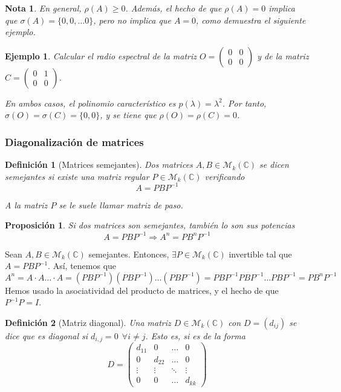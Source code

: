 \documentclass[11pt, a4paper]{article}
\makeatletter
\newif\IfInSansMode
\let\oldsf\sffamily
\renewcommand*{\sffamily}{\oldsf\mathversion{sans}\InSansModetrue}
\let\oldnorm\normalfont
\renewcommand*{\normalfont}{\oldnorm\InSansModefalse\mathversion{normal}}
\renewenvironment{proof}[1][\proofname] {\vspace{-15pt}\par\pushQED{\qed}\normalfont\topsep6\p@\@plus6\p@\relax\trivlist\item[\hskip\labelsep\it#1\@addpunct{.}]\ignorespaces}{\popQED\endtrivlist\@endpefalse}
\numberwithin{equation}{section}
\newcommand{\m}[4]{%
  \begin{pmatrix} #1 & #2 \\ #3 & #4\end{pmatrix}
}
\renewenvironment{proof}[1][\proofname] {\par\pushQED{\qed}\normalfont\topsep6\p@\@plus6\p@\relax\trivlist\item[\hskip\labelsep\itshape\sffamily#1\@addpunct{.}]\ignorespaces}{\popQED\endtrivlist\@endpefalse}
\theoremstyle{theorem-style}
\newtheorem{nprop}{Proposición}[section]
\theoremstyle{definition-style}
\newtheorem{ndef}{Definición}[section]
\theoremstyle{remark-style}
\newtheorem*{nota}{Nota}
\theoremstyle{example-style}
\newtheorem{ejemplo}{Ejemplo}[section]
\makeatother
\begin{document}
\begin{nota}
  En general, $\rho(A) \ge 0$. Además, el hecho de que $\rho(A) = 0$  implica que $\sigma(A) = \{0, 0, \hdots 0\}$, pero no implica que $A=0$, como demuestra el siguiente ejemplo.
  
\end{nota}

\begin{ejemplo} Calcular el radio espectral de la matriz $O = \m{0}{0}{0}{0}$ y de la matriz $C = \m{0}{1}{0}{0}$.

En ambos casos, el polinomio característico es $p(\lambda) = \lambda^2$. Por tanto, $\sigma(O) = \sigma(C) = \{0,0\}$, y se tiene que $\rho(O) = \rho(C) = 0$.
	
\end{ejemplo}

\subsubsection{Diagonalización de matrices}

\begin{ndef}[Matrices semejantes]
  Dos matrices $A, B \in \mathcal M_k(\mathbb C)$ se dicen \textit{semejantes} si
  existe una matriz regular $P \in \mathcal M_k(\mathbb C)$ verificando $$A
  = PBP^{-1}$$

A la matriz $P$ se le suele llamar \textit{matriz de paso}.
\end{ndef}

\begin{nprop} \label{potencias_semejantes}
  Si dos matrices son semejantes, también lo son sus potencias $$A = PBP^{-1}
  \Rightarrow A^n = PB^nP^{-1}$$
\end{nprop}

\begin{proof}
  Sean $A, B \in \mathcal M_k(\mathbb C)$ semejantes. Entonces, $\exists {P} \in
  \mathcal M_k(\mathbb C)$ invertible tal que $A = PBP^{-1}$. Así, tenemos que
$$A^n = A \cdot A \hdots \cdot A = (PBP^{-1})(PBP^{-1}) \hdots (PBP^{-1}) =
PBP^{-1}PBP^{-1}\hdots PBP^{-1} = PB^nP^{-1}$$ Hemos usado la asociatividad del producto de matrices, y el hecho de que $P^{-1}P = I$.
\end{proof}

\begin{ndef}[Matriz diagonal]
  Una matriz $D \in \mathcal M_k(\mathbb C)$ con $D = (d_{ij})$ se dice que es
  \textit{diagonal} si $d_{i,j} = 0\ \ \forall i \neq j$. Esto es, si es de la
  forma
$$ D =
\begin{pmatrix}
  d_{11} & 0 & \hdots & 0 \\
  0 & d_{22} & \hdots & 0 \\
  \vdots & \vdots & \ddots & \vdots \\
  0 & 0 & \hdots & d_{kk}
\end{pmatrix}$$

\end{ndef}
\end{document}
